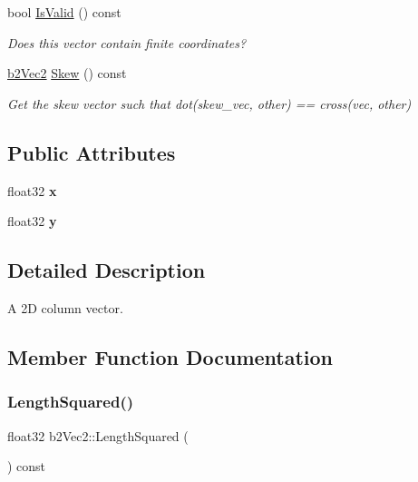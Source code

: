 \begin{DoxyCompactItemize}
\mbox{\label{structb2Vec2_abad59bf9a0269f02cda9dc919592c0ee}} 
bool \hyperlink{structb2Vec2_abad59bf9a0269f02cda9dc919592c0ee}{Is\+Valid} () const
\begin{DoxyCompactList}\small\item\em Does this vector contain finite coordinates? \end{DoxyCompactList}\item 
\mbox{\label{structb2Vec2_aaf36e082a20368b24edb635511872a74}} 
\hyperlink{structb2Vec2}{b2\+Vec2} \hyperlink{structb2Vec2_aaf36e082a20368b24edb635511872a74}{Skew} () const
\begin{DoxyCompactList}\small\item\em Get the skew vector such that dot(skew\+\_\+vec, other) == cross(vec, other) \end{DoxyCompactList}\end{DoxyCompactItemize}
\subsection*{Public Attributes}
\begin{DoxyCompactItemize}
\item 
\mbox{\label{structb2Vec2_a07021c1c08c547868e3cce9c9ef2ea71}} 
float32 {\bfseries x}
\item 
\mbox{\label{structb2Vec2_a880f573a9efe402ec207e9d132cb2a43}} 
float32 {\bfseries y}
\end{DoxyCompactItemize}


\subsection{Detailed Description}
A 2D column vector. 

\subsection{Member Function Documentation}
\mbox{\label{structb2Vec2_af8a081dac7eea7800fdbfbf95ac9e395}} 
\subsubsection{\texorpdfstring{Length\+Squared()}{LengthSquared()}\hspace{0.1cm}{\footnotesize\ttfamily [1/2]}}
{\footnotesize\ttfamily float32 b2\+Vec2\+::\+Length\+Squared (\begin{DoxyParamCaption}{ }\end{DoxyParamCaption}) const\hspace{0.3cm}{\ttfamily [inline]}}

